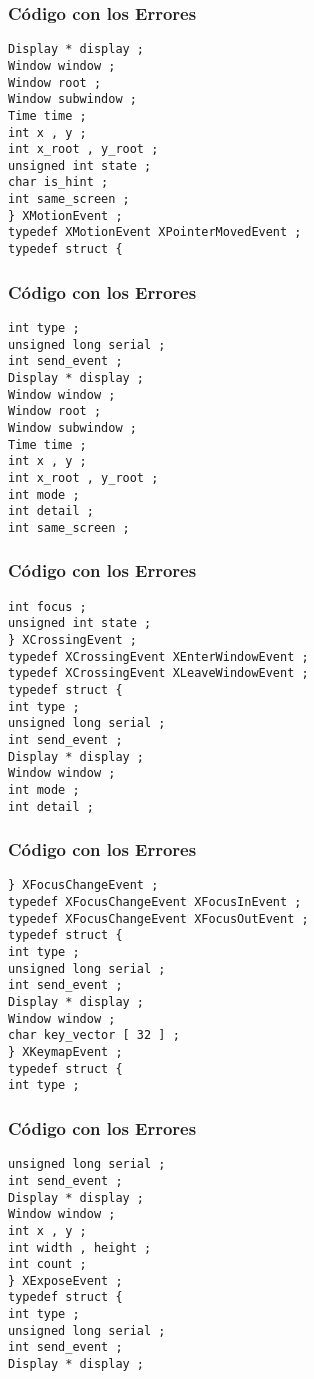 \documentclass{beamer}
\begin{document}
\begin{frame}[fragile]
\frametitle{C\'odigo con los Errores}
\begin{verbatim}
Display * display ; 
Window window ; 
Window root ; 
Window subwindow ; 
Time time ; 
int x , y ; 
int x_root , y_root ; 
unsigned int state ; 
char is_hint ; 
int same_screen ; 
} XMotionEvent ; 
typedef XMotionEvent XPointerMovedEvent ; 
typedef struct { 
\end{verbatim}
\end{frame}
\begin{frame}[fragile]
\frametitle{C\'odigo con los Errores}
\begin{verbatim}
int type ; 
unsigned long serial ; 
int send_event ; 
Display * display ; 
Window window ; 
Window root ; 
Window subwindow ; 
Time time ; 
int x , y ; 
int x_root , y_root ; 
int mode ; 
int detail ; 
int same_screen ; 
\end{verbatim}
\end{frame}
\begin{frame}[fragile]
\frametitle{C\'odigo con los Errores}
\begin{verbatim}
int focus ; 
unsigned int state ; 
} XCrossingEvent ; 
typedef XCrossingEvent XEnterWindowEvent ; 
typedef XCrossingEvent XLeaveWindowEvent ; 
typedef struct { 
int type ; 
unsigned long serial ; 
int send_event ; 
Display * display ; 
Window window ; 
int mode ; 
int detail ; 
\end{verbatim}
\end{frame}
\begin{frame}[fragile]
\frametitle{C\'odigo con los Errores}
\begin{verbatim}
} XFocusChangeEvent ; 
typedef XFocusChangeEvent XFocusInEvent ; 
typedef XFocusChangeEvent XFocusOutEvent ; 
typedef struct { 
int type ; 
unsigned long serial ; 
int send_event ; 
Display * display ; 
Window window ; 
char key_vector [ 32 ] ; 
} XKeymapEvent ; 
typedef struct { 
int type ; 
\end{verbatim}
\end{frame}
\begin{frame}[fragile]
\frametitle{C\'odigo con los Errores}
\begin{verbatim}
unsigned long serial ; 
int send_event ; 
Display * display ; 
Window window ; 
int x , y ; 
int width , height ; 
int count ; 
} XExposeEvent ; 
typedef struct { 
int type ; 
unsigned long serial ; 
int send_event ; 
Display * display ; 
\end{verbatim}
\end{frame}
\end{document}
